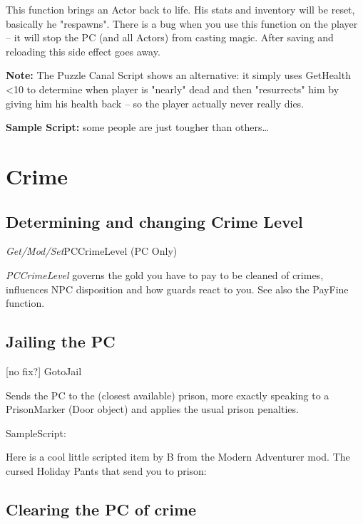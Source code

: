 \documentclass[
]{article}
\begin{document}
This function brings an Actor back to life. His stats and inventory will
be reset, basically he "respawns". There is a bug when you use this
function on the player -- it will stop the PC (and all Actors) from
casting magic. After saving and reloading this side effect goes away.

\textbf{Note:} The Puzzle Canal Script shows an alternative: it simply
uses GetHealth \textless10 to determine when player is "nearly" dead and
then "resurrects" him by giving him his health back -- so the player
actually never really dies.

\textbf{Sample Script:} some people are just tougher than others\ldots{}



\hypertarget{crime}{%
\section{\texorpdfstring{\hfill\break
Crime}{ Crime}}\label{crime}}

\hypertarget{determining-and-changing-crime-level}{%
\subsection{Determining and changing Crime
Level}\label{determining-and-changing-crime-level}}

\emph{Get/Mod/Set}PCCrimeLevel (PC Only)

\emph{PCCrimeLevel} governs the gold you have to pay to be cleaned of
crimes, influences NPC disposition and how guards react to you. See also
the PayFine function.

\hypertarget{jailing-the-pc}{%
\subsection{Jailing the PC}\label{jailing-the-pc}}

{[}no fix?{]} GotoJail

Sends the PC to the (closest available) prison, more exactly speaking to
a PrisonMarker (Door object) and applies the usual prison penalties.

SampleScript:

Here is a cool little scripted item by B from the Modern Adventurer mod.
The cursed Holiday Pants that send you to prison:



\hypertarget{clearing-the-pc-of-crime}{%
\subsection{Clearing the PC of crime}\label{clearing-the-pc-of-crime}}
\end{document}
